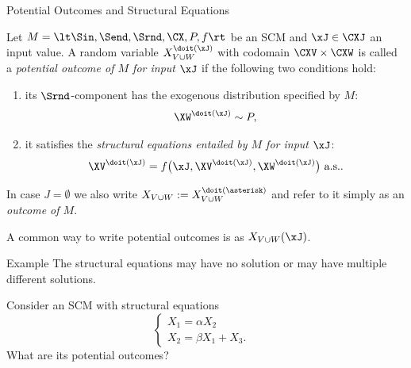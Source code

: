 \begin{frame}{Potential Outcomes and Structural Equations}
\begin{Def}\label{def:scm_solutions_for_inputs}
  Let $M = \lt \Sin, \Send, \Srnd, \CX, P, f \rt$ be an SCM
  and $\xJ \in \CXJ$ an input value.
  A random variable $X_{V \cup W}^{\doit(\xJ)}$ with codomain $\CXV \times \CXW$ is called
  a \emph{potential outcome of $M$ for input $\xJ$} 
  if the following two conditions hold:
    \begin{enumerate}
      \item its $\Srnd$-component has the exogenous distribution specified by $M$: 
        $$\XW^{\doit(\xJ)} \sim P,$$
      \item it satisfies the \emph{structural equations entailed by $M$ for input $\xJ$}:
        \begin{equation}\label{eq:cscm_structural_equations}
          \XV^{\doit(\xJ)} = f\big(\xJ, \XV^{\doit(\xJ)}, \XW^{\doit(\xJ)}\big) \text{ a.s.}.
        \end{equation}
    \end{enumerate}
  In case $J = \emptyset$ we also write $X_{V \cup W} := X_{V \cup W}^{\doit(\asterisk)}$ and refer to it simply as an \emph{outcome of $M$}.
\end{Def}
A common way to write potential outcomes is as $X_{V\cup W}(\xJ)$.
\end{frame}

\begin{frame}[t]{Example}
The structural equations  may have no solution or may have multiple different solutions.
\begin{Eg}
Consider an SCM with structural equations
$$\begin{cases}
  X_1 = \alpha X_2 & \\
  X_2 = \beta X_1 + X_3. &
\end{cases}$$
What are its potential outcomes?
\end{Eg}
\end{frame}

